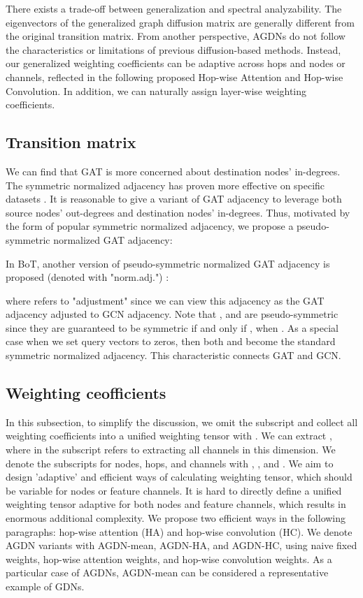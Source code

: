 \documentclass{article}
\begin{document}
There exists a trade-off between generalization and spectral analyzability. The eigenvectors of the generalized graph diffusion matrix are generally different from the original transition matrix. From another perspective, AGDNs do not follow the characteristics or limitations of previous diffusion-based methods. Instead, our generalized weighting coefficients can be adaptive across hops and nodes or channels, reflected in the following proposed Hop-wise Attention and Hop-wise Convolution. In addition, we can naturally assign layer-wise weighting coefficients.





\subsection{Transition matrix}

We can find that GAT is more concerned about destination nodes' in-degrees. The symmetric normalized adjacency has proven more effective on specific datasets \cite{kipf2016semi}. It is reasonable to give a variant of GAT adjacency to leverage both source nodes' out-degrees and destination nodes' in-degrees. Thus, motivated by the form of popular symmetric normalized adjacency, we propose a pseudo-symmetric normalized GAT adjacency:


In BoT, another version of pseudo-symmetric normalized GAT adjacency is proposed (denoted with "norm.adj.")  \cite{wang2021bag}:

where  refers to "adjustment" since we can view this adjacency as the GAT adjacency adjusted to GCN adjacency. Note that ,  and  are pseudo-symmetric since they are guaranteed to be symmetric if and only if , when . As a special case when we set query vectors to zeros, then both  and  become the standard symmetric normalized adjacency. This characteristic connects GAT and GCN.

\subsection{Weighting ceofficients}
In this subsection, to simplify the discussion, we omit the subscript  and collect all weighting coefficients  into a unified weighting tensor with . We can extract , where  in the subscript refers to extracting all channels in this dimension. We denote the subscripts for nodes, hops, and channels with , , and . We aim to design 'adaptive' and efficient ways of calculating weighting tensor, which should be variable for nodes or feature channels. It is hard to directly define a unified weighting tensor adaptive for both nodes and feature channels, which results in enormous additional complexity. We propose two efficient ways in the following paragraphs: hop-wise attention (HA) and hop-wise convolution (HC). We denote AGDN variants with AGDN-mean, AGDN-HA, and AGDN-HC, using naive fixed weights, hop-wise attention weights, and hop-wise convolution weights. As a particular case of AGDNs, AGDN-mean can be considered a representative example of GDNs.
\end{document}
